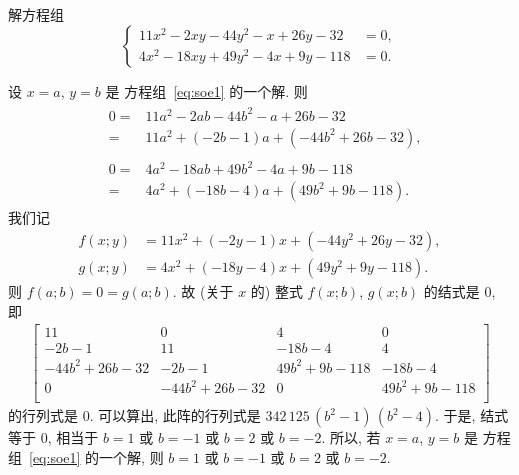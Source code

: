 \documentclass[../libro.tex]{subfiles}
\begin{document}
\begin{example}
    解方程组
    \begin{equation}
        \left\{ %
        \begin{aligned}
            11x^2 - 2xy - 44y^2 - x + 26y - 32  & = 0, \\
            4x^2 - 18xy + 49y^2 - 4x + 9y - 118 & = 0.
        \end{aligned}
        \right. %
        \label{eq:soe1}
    \end{equation}

    设 \(x = a\), \(y = b\) 是%
    方程组~\eqref{eq:soe1} 的一个解.
    则
    \begin{align*}
        &
        \begin{aligned}
            0
            = {} & 11a^2 - 2ab - 44b^2 - a + 26b - 32             \\
            = {} & 11 a^2 + (-2 b - 1) a + (-44 b^2 + 26 b - 32),
        \end{aligned}
        \\
        &
        \begin{aligned}
            0
            = {} & 4a^2 - 18ab + 49b^2 - 4a + 9b - 118           \\
            = {} & 4 a^2 + (-18 b - 4) a + (49 b^2 + 9 b - 118).
        \end{aligned}
    \end{align*}
    我们记
    \begin{align*}
        f(x; y) & = 11 x^2 + (-2 y - 1) x + (-44 y^2 + 26 y - 32), \\
        g(x; y) & = 4 x^2 + (-18 y - 4) x + (49 y^2 + 9 y - 118).
    \end{align*}
    则 \(f(a; b) = 0 = g(a; b)\).
    故 (关于 \(x\) 的) 整式
    \(f(x; b)\), \(g(x; b)\) 的结式是 \(0\),
    即
    \begin{align*}
        \begin{bmatrix}
            11            & 0             & 4            & 0            \\
            -2b-1         & 11            & -18b-4       & 4            \\
            -44b^2+26b-32 & -2b-1         & 49b^2+9b-118 & -18b-4       \\
            0             & -44b^2+26b-32 & 0            & 49b^2+9b-118 \\
        \end{bmatrix}
    \end{align*}
    的行列式是 \(0\).
    可以算出, 此阵的行列式是
    \(342\,125\, (b^2 - 1)\, (b^2 - 4)\).
    于是, 结式等于 \(0\),
    相当于 \(b = 1\) 或 \(b = -1\)
    或 \(b = 2\) 或 \(b = -2\).
    所以, 若 \(x = a\), \(y = b\) 是%
    方程组~\eqref{eq:soe1} 的一个解,
    则 \(b = 1\) 或 \(b = -1\)
    或 \(b = 2\) 或 \(b = -2\).


\end{example}
\end{document}
